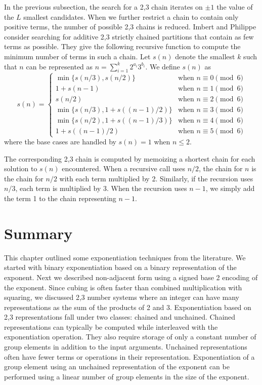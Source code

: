 \documentclass{ucalgthes1}
\theoremstyle{definition}
\begin{document}
In the previous subsection, the search for a 2,3 chain iterates on $\pm 1$ the value of the $L$ smallest candidates.  When we further restrict a chain to contain only positive terms, the number of possible 2,3 chains is reduced.  Imbert and Philippe \cite[\S 3]{Imbert2010b} consider searching for additive 2,3 strictly chained partitions that contain as few terms as possible.  They give the following recursive function to compute the minimum number of terms in such a chain. Let $s(n)$ denote the smallest $k$ such that $n$ can be represented as $n = \sum_{i=1}^k 2^{a_i} 3^{b_i}$. We define $s(n)$ as
\begin{equation*}
s(n) = \begin{cases}
	\min\{s(n/3), s(n/2)\} & \textrm{when } n \equiv 0 \pmod 6 \\
	1 + s(n-1) & \textrm{when } n \equiv 1 \pmod 6 \\
	s(n/2) & \textrm{when } n \equiv 2 \pmod 6 \\
	\min\{s(n/3), 1 + s((n-1)/2)\} & \textrm{when } n \equiv 3 \pmod 6 \\ 
	\min\{s(n/2), 1 + s((n-1)/3)\} & \textrm{when } n \equiv 4 \pmod 6 \\
	1 + s((n-1)/2) & \textrm{when } n \equiv 5 \pmod 6
\end{cases}
\end{equation*}
where the base cases are handled by $s(n) = 1$ when $n \le 2$.

The corresponding 2,3 chain is computed by memoizing a shortest chain for each solution to $s(n)$ encountered. When a recursive call uses $n/2$, the chain for $n$ is the chain for $n/2$ with each term multiplied by 2.  Similarly, if the recursion uses $n/3$, each term is multiplied by 3.  When the recursion uses $n-1$, we simply add the term 1 to the chain representing $n-1$.


\section{Summary}

This chapter outlined some exponentiation techniques from the literature.  We started with binary exponentiation based on a binary representation of the exponent.  Next we described non-adjacent form using a signed base 2 encoding of the exponent.  Since cubing is often faster than combined multiplication with squaring, we discussed 2,3 number systems where an integer can have many representations as the sum of the products of 2 and 3.  Exponentiation based on 2,3 representations fall under two classes: chained and unchained.  Chained representations can typically be computed while interleaved with the exponentiation operation.  They also require storage of only a constant number of group elements in addition to the input arguments.  Unchained representations often have fewer terms or operations in their representation.  Exponentiation of a group element using an unchained representation of the exponent can be performed using a linear number of group elements in the size of the exponent.
\end{document}

